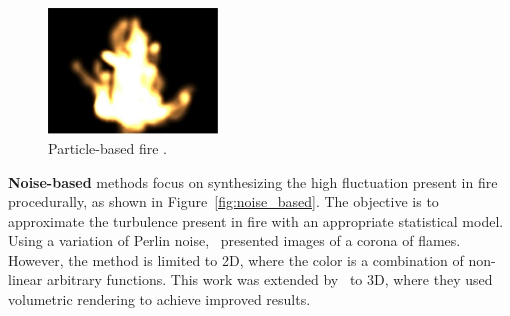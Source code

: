\begin{figure}[htpb!]
        \centering
		\includegraphics[width=0.4\textwidth]{img/perry_1994}
        \caption{Particle-based fire \cite{Perry:1994}.}
        \label{fig:particle_based}
\end{figure}

\textbf{Noise-based} methods focus on synthesizing the high fluctuation present in fire procedurally, as shown in Figure~\ref{fig:noise_based}.
The objective is to approximate the turbulence present in fire with an appropriate statistical model.
Using a variation of Perlin noise,~\cite{Perlin:1985} presented images of a corona of flames.
However, the method is limited to 2D, where the color is a combination of non-linear arbitrary functions.
This work was extended by~\cite{Perlin:1989} to 3D, where they used volumetric rendering to achieve improved results.


